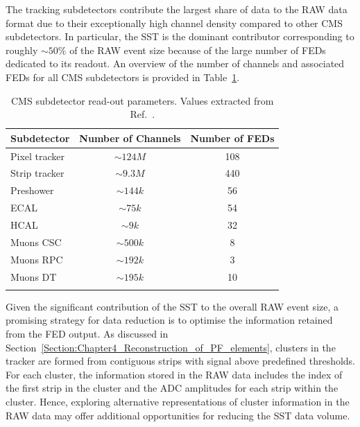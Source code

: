 The tracking subdetectors contribute the largest share of data to the RAW data format due to their exceptionally high channel density compared to other CMS subdetectors. In particular, the SST is the dominant contributor corresponding to roughly $\sim 50\%$ of the RAW event size because of the large number of FEDs dedicated to its readout. An overview of the number of channels and associated FEDs for all CMS subdetectors is provided in Table~\ref{Table:Chapter4_RAW_Channels_FED}.

\begin{table}[htbp]
\centering
\renewcommand{\arraystretch}{1.5} %
\begin{tabular}{|l|c|c|}
\hline
Subdetector & Number of Channels & Number of FEDs \\
\hline \hline
Pixel tracker & $\sim124\unit{M}$ & 108 \\
\arrayrulecolor{lightgray} \hline
Strip tracker & $\sim9.3\unit{M}$ & 440 \\
\arrayrulecolor{lightgray} \hline
Preshower & $\sim144\unit{k}$ & 56 \\
\arrayrulecolor{lightgray} \hline
ECAL & $\sim75\unit{k}$ & 54 \\
\arrayrulecolor{lightgray} \hline
HCAL & $\sim9\unit{k}$ & 32 \\
\arrayrulecolor{lightgray} \hline
Muons CSC & $\sim500\unit{k}$ & 8 \\
\arrayrulecolor{lightgray} \hline
Muons RPC & $\sim192\unit{k}$ & 3 \\
\arrayrulecolor{lightgray} \hline
Muons DT & $\sim195\unit{k}$ & 10 \\
\arrayrulecolor{lightgray} \hline
\arrayrulecolor{black} \hline
\end{tabular}
\caption[CMS subdetector read-out parameters]{CMS subdetector read-out parameters. Values extracted from Ref.~\cite{LHC_CMS,CMS_Tracker_Phase1_Upgrade_2}.}
\label{Table:Chapter4_RAW_Channels_FED}
\end{table}

Given the significant contribution of the SST to the overall RAW event size, a promising strategy for data reduction is to optimise the information retained from the FED output. As discussed in Section~\ref{Section:Chapter4_Reconstruction_of_PF_elements}, clusters in the tracker are formed from contiguous strips with signal above predefined thresholds. For each cluster, the information stored in the RAW data includes the index of the first strip in the cluster and the ADC amplitudes for each strip within the cluster. Hence, exploring alternative representations of cluster information in the RAW data may offer additional opportunities for reducing the SST data volume.

